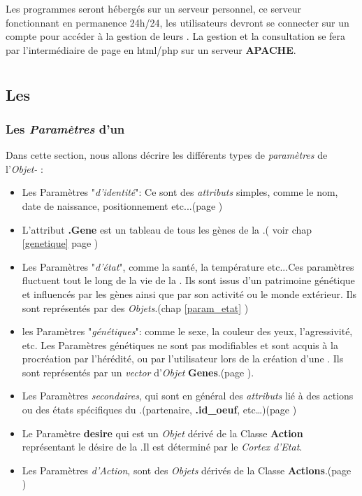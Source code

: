 \documentclass[french]{report}
\newlength{\du}\fi
\begin{document}
Les programmes seront hébergés sur un serveur personnel, ce serveur fonctionnant en permanence 24h/24, les utilisateurs devront se connecter sur un compte pour accéder à la gestion de leurs \CoCiX. La gestion et la consultation se fera par l'intermédiaire de page en html/php sur un serveur \textbf{APACHE}.

\part{\CoCiX}

\chapter{Les \CoCiX}
\section{Les \textit{Paramètres} d'un \CoCiX}\label{parametre}
Dans cette section, nous allons décrire les différents types de \textit{paramètres} de l'\textit{Objet-\CoCiX} :\\


\begin{itemize}
\item Les Paramètres "\textit{d'identité}": Ce sont des \textit{attributs} simples, comme le nom, date de naissance, positionnement etc...(page \pageref{identite})
\item L'attribut \textbf{.Gene} est un tableau de tous les gènes de la \CoCiX.( voir chap \ref{genetique} page \pageref{genome})

\item Les Paramètres "\textit{d'état}", comme la santé, la température etc...Ces paramètres fluctuent tout le long de la vie de la \CoCiX. Ils sont issus d'un patrimoine génétique et influencés par les gènes ainsi que par son activité ou le monde extérieur. Ils sont représentés par des  \textit{Objets}.(chap \ref{param_etat} \pageref{param_etat})

\item les Paramètres "\textit{génétiques}": comme le sexe, la couleur des yeux, l'agressivité, etc. Les Paramètres génétiques ne sont pas modifiables et sont acquis à la procréation par l'hérédité, ou par l'utilisateur lors de la création d'une \CoCiX. Ils sont représentés par un \textit{vector} d'\textit{Objet} \textbf{Genes}.(page \pageref{genetique}).


\item Les Paramètres \textit{secondaires}, qui sont en général des \textit{attributs} lié à des actions ou des états spécifiques du \CoCiX.(partenaire, \textbf{.id\_oeuf}, etc\dots)(page \pageref{param_second})

\item Le Paramètre \textbf{desire} qui est un \textit{Objet} dérivé de la Classe \textbf{Action} représentant le désire de la \CoCiX.Il est déterminé par le \textit{Cortex d'Etat}.

\item Les Paramètres \textit{d'Action}, sont des \textit{Objets} dérivés de la Classe \textbf{Actions}.(page \pageref{param_action})\\
\end{itemize}
\end{document}
